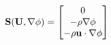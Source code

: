 \documentclass[preview]{standalone}
\begin{document}
\begin{align*}
\special{dvisvgm:raw <g id='unique000'>}\mathbf{S}(\mathbf{U}, \nabla\phi) = \begin{bmatrix}0 \\ -\rho\nabla\phi \\ -\rho\mathbf{u}\cdot\nabla\phi\end{bmatrix}\special{dvisvgm:raw </g>}
\end{align*}
\end{document}
